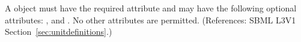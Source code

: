 A \UnitDefinition object must have the required attribute 
 and may have the following optional attributes:
,  and .  No other attributes are permitted.  
(References: SBML L3V1 Section~\ref{sec:unitdefinitions}.)
